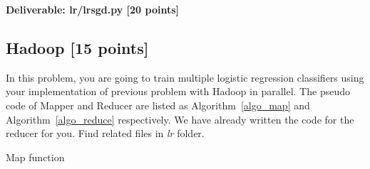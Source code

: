 \documentclass[12pt]{article}
\begin{document}
\vspace{5mm}

\textbf{Deliverable: lr/lrsgd.py [20 points]}

\subsection{Hadoop [15 points]}
In this problem, you are going to train multiple logistic regression classifiers using your implementation of previous problem with Hadoop in parallel. The pseudo code of Mapper and Reducer are listed as Algorithm~\ref{algo_map} and Algorithm~\ref{algo_reduce} respectively. We have already written the code for the reducer for you. Find related files in \textit{lr} folder.

\begin{algorithm}
\BlankLine
{}
\caption{Map function}\label{algo_map}
\end{algorithm}
\end{document}
